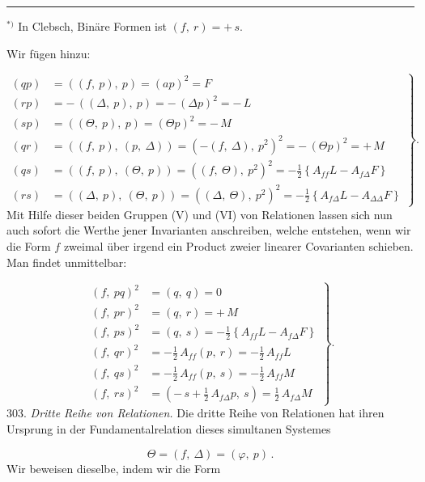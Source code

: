 \documentclass[11pt]{article}
\providecommand{\weberpage}[1]{}
\providecommand{\weq}[2]{\begin{equation}\tag{#1}#2\end{equation}}
\let\Delta\varDelta
\let\Theta\varTheta
\begin{document}
\par\noindent\rule{0.3\linewidth}{0.4pt}\par
{\footnotesize $^{*)}$ In Clebsch, \glqq Bin\"are Formen\grqq{} ist $(f,\
r) = +\,s$.}


\weberpage{326}
Wir fügen hinzu:

\weq{VI}{\left.\begin{aligned}
(qp) &= ((f,\ p),\ p) = (ap)^2 = F\\
(rp) &= -\,((\Delta,\ p),\ p) = -\,(\Delta p)^2 = -\,L\\
(sp) &= ((\Theta,\ p),\ p) = (\Theta p)^2 = -\,M\\ %
(qr) &= ((f,\ p),\ (p,\ \Delta)) = (-(f,\ \Delta),\ p^2)^2 = -\,(\Theta p)^2 = +\,M\\
(qs) &= ((f,\ p),\ (\Theta,\ p)) = ((f,\ \Theta),\ p^2)^2 = -\tfrac{1}{2}\left\{A_{ff}L - A_{f\Delta}F\right\}\\
(rs) &= ((\Delta,\ p),\ (\Theta,\ p)) = ((\Delta,\ \Theta),\ p^2)^2 = -\tfrac{1}{2}\left\{A_{f\Delta}L - A_{\Delta\Delta}F\right\}
\end{aligned}\right\}.}
Mit Hilfe dieser beiden Gruppen (V) und (VI) von Relationen lassen sich nun
auch sofort die Werthe jener Invarianten anschreiben, welche entstehen,
wenn wir die Form $f$ zweimal über irgend ein Product zweier linearer
Covarianten schieben. Man findet unmittelbar:

\weq{VII}{\left.\begin{aligned}
(f,\ pq)^2 &= (q,\ q) = 0\\
(f,\ pr)^2 &= (q,\ r) = +\,M\\
(f,\ ps)^2 &= (q,\ s) = -\tfrac{1}{2}\left\{A_{ff}L - A_{f\Delta}F\right\}\\
(f,\ qr)^2 &= -\tfrac{1}{2}\,A_{ff}(p,\ r) = -\tfrac{1}{2}\,A_{ff}L\\
(f,\ qs)^2 &= -\tfrac{1}{2}\,A_{ff}(p,\ s) = -\tfrac{1}{2}\,A_{ff}M\\
(f,\ rs)^2 &= \left(-\,s + \tfrac{1}{2}\,A_{f\Delta}p,\ s\right) = \tfrac{1}{2}\,A_{f\Delta}M
\end{aligned}\right\}.}
303. \textit{Dritte Reihe von Relationen.} Die dritte Reihe von Relationen
hat ihren Ursprung in der Fundamentalrelation dieses simultanen Systemes

\weq{VIII}{\Theta = (f,\ \Delta) = (\varphi,\ p)\,.}
Wir beweisen dieselbe, indem wir die Form
\end{document}
